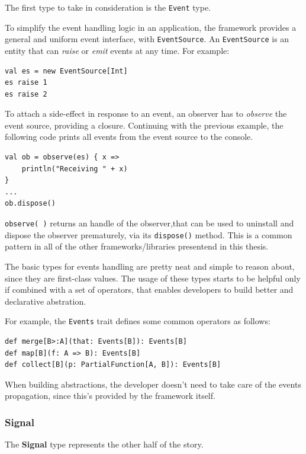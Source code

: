 The first type to take in consideration is the \texttt{Event} type.

To simplify the event handling logic in an application, the framework
provides a general and uniform event interface, with
\texttt{EventSource}. An \texttt{EventSource} is an entity that can
\emph{raise} or \emph{emit} events at any time. For example:

\begin{verbatim}
val es = new EventSource[Int]
es raise 1
es raise 2
\end{verbatim}

To attach a side-effect in response to an event, an observer has to
\emph{observe} the event source, providing a closure. Continuing with
the previous example, the following code prints all events from the
event source to the console.

\begin{verbatim}
val ob = observe(es) { x =>
    println("Receiving " + x)
}
...
ob.dispose()
\end{verbatim}

\texttt{observe(\ )} returns an handle of the observer,that can be used
to uninstall and dispose the observer prematurely, via its
\texttt{dispose()} method. This is a common pattern in all of the other
frameworks/libraries presentend in this thesis.

The basic types for events handling are pretty neat and simple to reason
about, since they are first-class values. The usage of these types
starts to be helpful only if combined with a set of operators, that
enables developers to build better and declarative abstration.

For example, the \texttt{Events} trait defines some common operators as
follows:

\begin{verbatim}
def merge[B>:A](that: Events[B]): Events[B]
def map[B](f: A => B): Events[B]
def collect[B](p: PartialFunction[A, B]): Events[B]
\end{verbatim}

When building abstractions, the developer doesn't need to take care of
the events propagation, since this's provided by the framework itself.

\subsubsection{Signal}\label{signal}

The \textbf{Signal} type represents the other half of the story.

